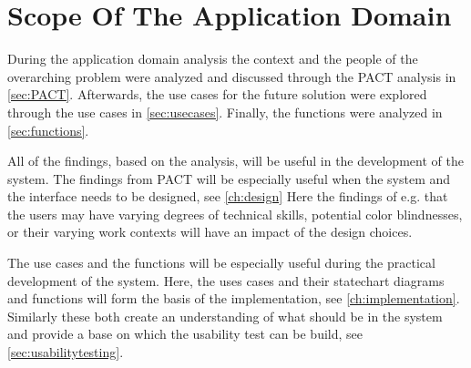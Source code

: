 \section{Scope Of The Application Domain}

During the application domain analysis the context and the people of the overarching problem were analyzed and discussed through the PACT analysis in \cref{sec:PACT}.
Afterwards, the use cases for the future solution were explored through the use cases in \cref{sec:usecases}.
Finally, the functions were analyzed in \cref{sec:functions}.

All of the findings, based on the analysis, will be useful in the development of the system.
The findings from PACT will be especially useful when the system and the interface needs to be designed, see \cref{ch:design}
Here the findings of e.g. that the users may have varying degrees of technical skills, potential color blindnesses, or their varying work contexts will have an impact of the design choices.

The use cases and the functions will be especially useful during the practical development of the system.
Here, the uses cases and their statechart diagrams and functions will form the basis of the implementation, see \cref{ch:implementation}.
Similarly these both create an understanding of what should be in the system and provide a base on which the usability test can be build, see \cref{sec:usabilitytesting}.
